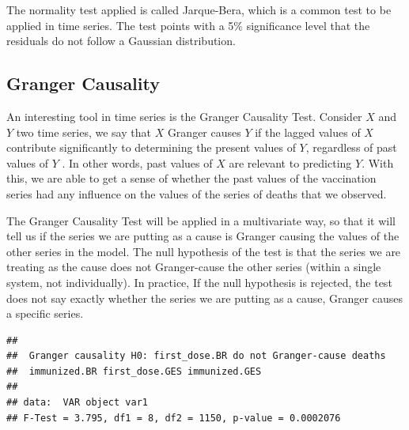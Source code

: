 \documentclass[
]{article}
\newenvironment{Shaded}{\begin{snugshade}}{\end{snugshade}}
\newcommand{\AttributeTok}[1]{\textcolor[rgb]{0.13,0.29,0.53}{#1}}
\newcommand{\CommentTok}[1]{\textcolor[rgb]{0.56,0.35,0.01}{\textit{#1}}}
\newcommand{\FunctionTok}[1]{\textcolor[rgb]{0.13,0.29,0.53}{\textbf{#1}}}
\newcommand{\NormalTok}[1]{#1}
\newcommand{\OtherTok}[1]{\textcolor[rgb]{0.56,0.35,0.01}{#1}}
\newcommand{\SpecialCharTok}[1]{\textcolor[rgb]{0.81,0.36,0.00}{\textbf{#1}}}
\newcommand{\StringTok}[1]{\textcolor[rgb]{0.31,0.60,0.02}{#1}}
\renewenvironment{Shaded}{\begin{mdframed}[ backgroundcolor=shadecolor, linecolor = shadecolor, leftmargin=\dimexpr\leftmargin-2pt\relax, innerleftmargin=1.6pt, innertopmargin=5pt, skipabove=10pt,skipbelow=3pt ]}{\end{mdframed}}
\begin{document}
The normality test applied is called Jarque-Bera, which is a common test
to be applied in time series. The test points with a 5\% significance
level that the residuals do not follow a Gaussian distribution.

\subsection{Granger Causality}\label{granger-causality}

An interesting tool in time series is the Granger Causality Test.
Consider \(X\) and \(Y\) two time series, we say that \(X\) Granger
causes \(Y\) if the lagged values of \(X\) contribute significantly to
determining the present values of \(Y\), regardless of past values of
\(Y\) . In other words, past values of \(X\) are relevant to predicting
\(Y\). With this, we are able to get a sense of whether the past values
of the vaccination series had any influence on the values of the series
of deaths that we observed.

The Granger Causality Test will be applied in a multivariate way, so
that it will tell us if the series we are putting as a cause is Granger
causing the values of the other series in the model. The null hypothesis
of the test is that the series we are treating as the cause does not
Granger-cause the other series (within a single system, not
individually). In practice, If the null hypothesis is rejected, the test
does not say exactly whether the series we are putting as a cause,
Granger causes a specific series.

\begin{Shaded}
\end{Shaded}

\begin{verbatim}
## 
##  Granger causality H0: first_dose.BR do not Granger-cause deaths
##  immunized.BR first_dose.GES immunized.GES
## 
## data:  VAR object var1
## F-Test = 3.795, df1 = 8, df2 = 1150, p-value = 0.0002076
\end{verbatim}

\begin{Shaded}
\end{Shaded}
\end{document}
